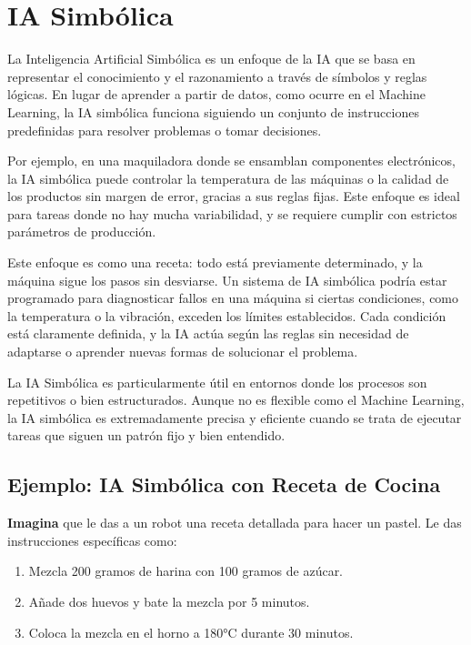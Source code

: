 \section{IA Simbólica}\label{ia-simbolica}

La Inteligencia Artificial Simbólica es un enfoque de la IA que se basa en representar el conocimiento y el razonamiento a través de símbolos y reglas lógicas. En lugar de aprender a partir de datos, como ocurre en el Machine Learning, la IA simbólica funciona siguiendo un conjunto de instrucciones predefinidas para resolver problemas o tomar decisiones.

Por ejemplo, en una maquiladora donde se ensamblan componentes electrónicos, la IA simbólica puede controlar la temperatura de las máquinas o la calidad de los productos sin margen de error, gracias a sus reglas fijas. Este enfoque es ideal para tareas donde no hay mucha variabilidad, y se requiere cumplir con estrictos parámetros de producción.

Este enfoque es como una receta: todo está previamente determinado, y la máquina sigue los pasos sin desviarse. Un sistema de IA simbólica podría estar programado para diagnosticar fallos en una máquina si ciertas condiciones, como la temperatura o la vibración, exceden los límites establecidos. Cada condición está claramente definida, y la IA actúa según las reglas sin necesidad de adaptarse o aprender nuevas formas de solucionar el problema.

La IA Simbólica es particularmente útil en entornos donde los procesos son repetitivos o bien estructurados. Aunque no es flexible como el Machine Learning, la IA simbólica es extremadamente precisa y eficiente cuando se trata de ejecutar tareas que siguen un patrón fijo y bien entendido.

\subsection{Ejemplo: IA Simbólica con Receta de Cocina}\label{ejemplo-ia-simbolica}

\textbf{Imagina} que le das a un robot una receta detallada para hacer un pastel. Le das instrucciones específicas como:

\begin{enumerate}
    \item Mezcla 200 gramos de harina con 100 gramos de azúcar.
    \item Añade dos huevos y bate la mezcla por 5 minutos.
    \item Coloca la mezcla en el horno a 180°C durante 30 minutos.
\end{enumerate}

